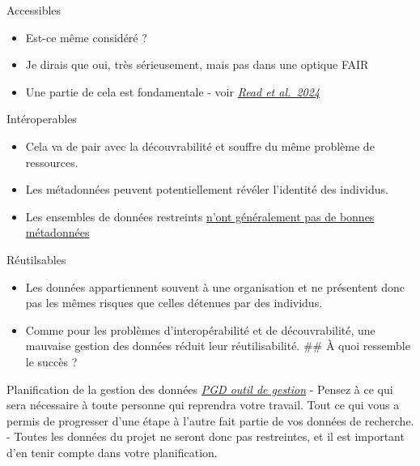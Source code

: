\documentclass[
  ignorenonframetext,
]{beamer}
\providecommand{\tightlist}{%
  \setlength{\itemsep}{0pt}\setlength{\parskip}{0pt}}
\begin{document}
\begin{frame}{Accessibles}
\label{accessibles}
\begin{itemize}
\tightlist
\item
  Est-ce même considéré ?
\item
  Je dirais que oui, très sérieusement, mais pas dans une optique FAIR\\
\item
  Une partie de cela est fondamentale - voir
  \href{https://doi.org/10.7191/jeslib.907}{\emph{Read et al.~2024}}
\end{itemize}
\end{frame}

\begin{frame}{Intéroperables}
\label{intuxe9roperables}
\begin{itemize}
\tightlist
\item
  Cela va de pair avec la découvrabilité et souffre du même problème de
  ressources.
\item
  Les métadonnées peuvent potentiellement révéler l'identité des
  individus.
\item
  Les ensembles de données restreints
  \href{https://doi.org/10.1139/facets-2023-0102}{n'ont généralement pas
  de bonnes métadonnées}
\end{itemize}
\end{frame}

\begin{frame}{Réutilsables}
\label{ruxe9utilsables}
\begin{itemize}
\tightlist
\item
  Les données appartiennent souvent à une organisation et ne présentent
  donc pas les mêmes risques que celles détenues par des individus.
\item
  Comme pour les problèmes d'interopérabilité et de découvrabilité, une
  mauvaise gestion des données réduit leur réutilisabilité. \#\# À quoi
  ressemble le succès ?
\end{itemize}
\end{frame}

\begin{frame}{Planification de la gestion des données}
\label{planification-de-la-gestion-des-donnuxe9es}
\href{https://dmp-pgd.ca/}{\emph{PGD outil de gestion}} - Pensez à ce
qui sera nécessaire à toute personne qui reprendra votre travail. Tout
ce qui vous a permis de progresser d'une étape à l'autre fait partie de
vos données de recherche. - Toutes les données du projet ne seront donc
pas restreintes, et il est important d'en tenir compte dans votre
planification.
\end{frame}
\end{document}
